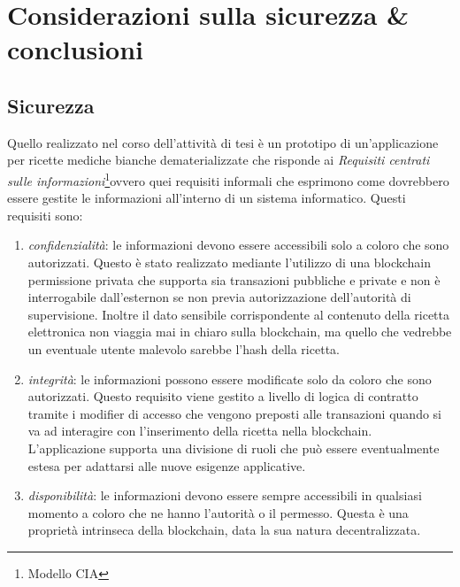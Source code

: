 %
%
\chapter{Considerazioni sulla sicurezza \& conclusioni}
%
\label{cap:conclusioni}
%
\section{Sicurezza}
%
Quello realizzato nel corso dell'attività di tesi è un prototipo di un'applicazione per ricette mediche bianche dematerializzate che risponde ai \emph{Requisiti centrati sulle informazioni}\footnote{Modello CIA}ovvero quei requisiti informali che esprimono come dovrebbero essere gestite le informazioni all'interno di un sistema informatico. Questi requisiti sono:
\begin{enumerate}
	\item \emph{confidenzialità}: le informazioni devono essere accessibili solo a coloro che sono autorizzati. Questo è stato realizzato mediante l'utilizzo di una blockchain permissione privata che supporta sia transazioni pubbliche e private e non è interrogabile dall'esternon se non previa autorizzazione dell'autorità di supervisione. Inoltre il dato sensibile corrispondente al contenuto della ricetta elettronica non viaggia mai in chiaro sulla blockchain, ma quello che vedrebbe un eventuale utente malevolo sarebbe l'hash della ricetta.
	\item \emph{integrità}: le informazioni possono essere modificate solo da coloro che sono autorizzati. Questo requisito viene gestito a livello di logica di contratto tramite i modifier di accesso che vengono preposti alle transazioni quando si va ad interagire con l'inserimento della ricetta nella blockchain. L'applicazione supporta una divisione di ruoli che può essere eventualmente estesa per adattarsi alle nuove esigenze applicative.
	\item \emph{disponibilità}: le informazioni devono essere sempre accessibili in qualsiasi momento a coloro che ne hanno l'autorità o il permesso. Questa è una proprietà intrinseca della blockchain, data la sua natura decentralizzata.
\end{enumerate}
